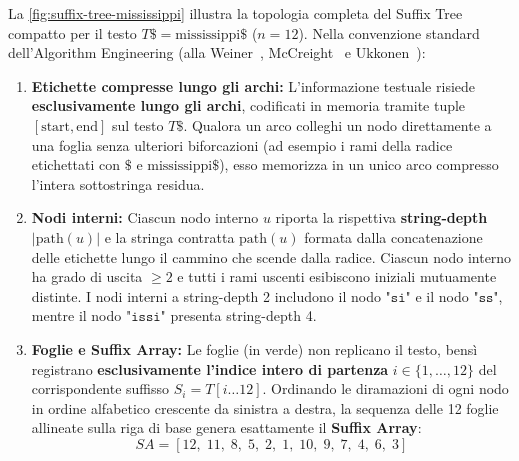 La \autoref{fig:suffix-tree-mississippi} illustra la topologia completa del Suffix Tree compatto per il testo $T\$ = \text{mississippi}\$$ ($n = 12$). Nella convenzione standard dell'Algorithm Engineering (alla Weiner~\cite{weiner1973}, McCreight~\cite{mccreight1976} e Ukkonen~\cite{ukkonen1995}):
\begin{enumerate}
  \item \textbf{Etichette compresse lungo gli archi:} L'informazione testuale risiede \textbf{esclusivamente lungo gli archi}, codificati in memoria tramite tuple $[\text{start}, \text{end}]$ sul testo $T\$$. Qualora un arco colleghi un nodo direttamente a una foglia senza ulteriori biforcazioni (ad esempio i rami della radice etichettati con $\$$ e $\text{mississippi}\$$), esso memorizza in un unico arco compresso l'intera sottostringa residua.
  \item \textbf{Nodi interni:} Ciascun nodo interno $u$ riporta la rispettiva \textbf{string-depth} $|\text{path}(u)|$ e la stringa contratta $\text{path}(u)$ formata dalla concatenazione delle etichette lungo il cammino che scende dalla radice. Ciascun nodo interno ha grado di uscita $\ge 2$ e tutti i rami uscenti esibiscono iniziali mutuamente distinte. I nodi interni a string-depth 2 includono il nodo $\texttt{"si"}$ e il nodo $\texttt{"ss"}$, mentre il nodo $\texttt{"issi"}$ presenta string-depth 4.
  \item \textbf{Foglie e Suffix Array:} Le foglie (in verde) non replicano il testo, bens\`i registrano \textbf{esclusivamente l'indice intero di partenza} $i \in \{1, \dots, 12\}$ del corrispondente suffisso $S_i = T[i \dots 12]$. Ordinando le diramazioni di ogni nodo in ordine alfabetico crescente da sinistra a destra, la sequenza delle 12 foglie allineate sulla riga di base genera esattamente il \textbf{Suffix Array}:
  \begin{equation}
    SA = [12, \; 11, \; 8, \; 5, \; 2, \; 1, \; 10, \; 9, \; 7, \; 4, \; 6, \; 3]
  \end{equation}
\end{enumerate}

